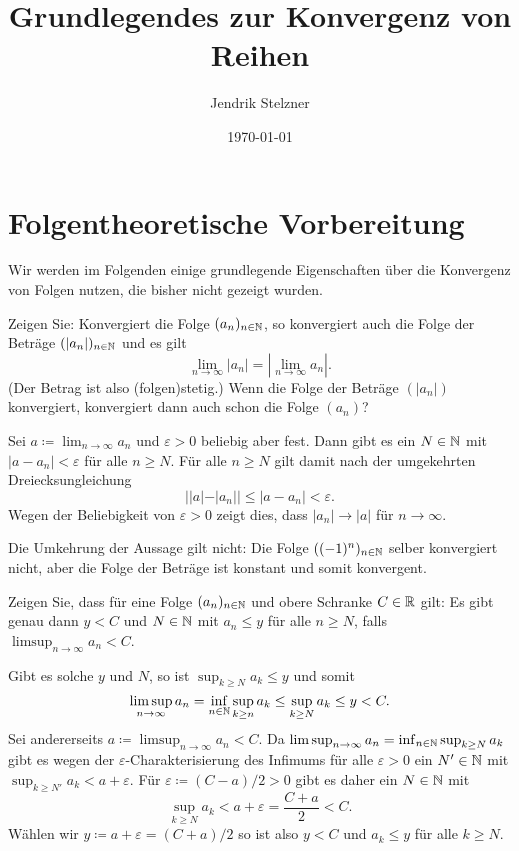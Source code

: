\documentclass[a4paper,10pt]{article}
\title{Grundlegendes zur Konvergenz von Reihen}
\author{Jendrik Stelzner}
\date{\today}
\begin{document}
\maketitle

\tableofcontents





\section{Folgentheoretische Vorbereitung}


Wir werden im Folgenden einige grundlegende Eigenschaften über die Konvergenz von Folgen nutzen, die bisher nicht gezeigt wurden.


\begin{question}
 Zeigen Sie: Konvergiert die Folge $(a_n)_{n \in \mathbb{N}}$, so konvergiert auch die Folge der Beträge $(|a_n|)_{n \in \mathbb{N}}$ und es gilt
 \[
  \lim_{n \to \infty} |a_n| = \left| \lim_{n \to \infty} a_n \right|.
 \]
 (Der Betrag ist also (folgen)stetig.) Wenn die Folge der Beträge $(|a_n|)$ konvergiert, konvergiert dann auch schon die Folge $(a_n)$?
\end{question}
\begin{solution}
 Sei $a \coloneqq \lim_{n \to \infty} a_n$ und $\varepsilon > 0$ beliebig aber fest. Dann gibt es ein $N \in \mathbb{N}$ mit $|a - a_n| < \varepsilon$ für alle $n \geq N$. Für alle $n \geq N$ gilt damit nach der umgekehrten Dreiecksungleichung
 \[
  ||a| - |a_n|| \leq |a - a_n| < \varepsilon.
 \]
 Wegen der Beliebigkeit von $\varepsilon > 0$ zeigt dies, dass $|a_n| \to |a|$ für $n \to \infty$.
 
 Die Umkehrung der Aussage gilt nicht: Die Folge $((-1)^n)_{n \in \mathbb{N}}$ selber konvergiert nicht, aber die Folge der Beträge ist konstant und somit konvergent.
\end{solution}


\begin{question}
 Zeigen Sie, dass für eine Folge $(a_n)_{n \in \mathbb{N}}$ und obere Schranke $C \in \mathbb{R}$ gilt: Es gibt genau dann $y < C$ und $N \in \mathbb{N}$ mit $a_n \leq y$ für alle $n \geq N$, falls $\limsup_{n \to \infty} a_n < C$.
\end{question}
\begin{solution}
 Gibt es solche $y$ und $N$, so ist $\sup_{k \geq N} a_k \leq y$ und somit
 \[
  \limsup_{n \to \infty} a_n
  = \inf_{n \in \mathbb{N}} \sup_{k \geq n} a_k
  \leq \sup_{k \geq N} a_k
  \leq y
  < C.
 \]
 Sei andererseits $a \coloneqq \limsup_{n \to \infty} a_n < C$. Da $\limsup_{n \to \infty} a_n = \inf_{n \in \mathbb{N}} \sup_{k \geq N} a_k$ gibt es wegen der $\varepsilon$-Charakterisierung des Infimums für alle $\varepsilon > 0$ ein $N' \in \mathbb{N}$ mit $\sup_{k \geq N'} a_k < a + \varepsilon$. Für $\varepsilon \coloneqq (C-a)/2 > 0$ gibt es daher ein $N \in \mathbb{N}$ mit
 \[
  \sup_{k \geq N} a_k < a + \varepsilon = \frac{C + a}{2} < C.
 \]
 Wählen wir $y \coloneqq a + \varepsilon = (C+a)/2$ so ist also $y < C$ und $a_k \leq y$ für alle $k \geq N$.
\end{solution}
\end{document}
